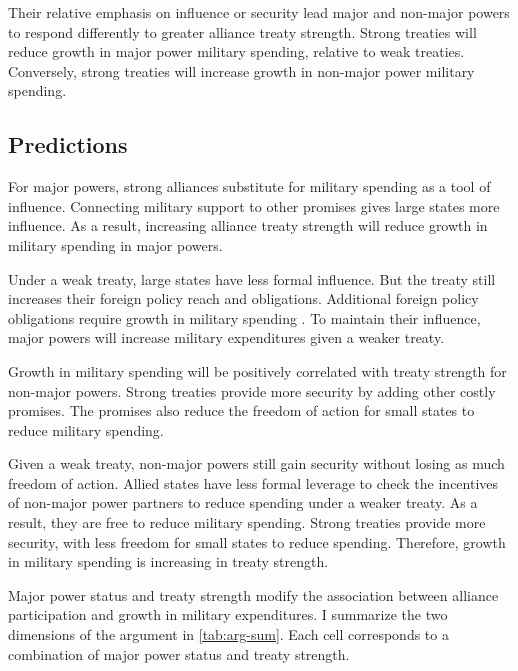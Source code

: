 \documentclass[12pt]{article}
\begin{document}
Their relative emphasis on influence or security lead major and non-major powers to respond differently to greater alliance treaty strength. 
Strong treaties will reduce growth in major power military spending, relative to weak treaties. 
Conversely, strong treaties will increase growth in non-major power military spending. 

 


\subsection{Predictions} 

 
For major powers, strong alliances substitute for military spending as a tool of influence. 
Connecting military support to other promises gives large states more influence.
As a result, increasing alliance treaty strength will reduce growth in military spending in major powers. 


Under a weak treaty, large states have less formal influence. 
But the treaty still increases their foreign policy reach and obligations. 
Additional foreign policy obligations require growth in military spending \citep{Diehl1994}. 
To maintain their influence, major powers will increase military expenditures given a weaker treaty. 


Growth in military spending will be positively correlated with treaty strength for non-major powers. 
Strong treaties provide more security by adding other costly promises. 
The promises also reduce the freedom of action for small states to reduce military spending. 


Given a weak treaty, non-major powers still gain security without losing as much freedom of action. 
Allied states have less formal leverage to check the incentives of non-major power partners to reduce spending under a weaker treaty. 
As a result, they are free to reduce military spending. 
Strong treaties provide more security, with less freedom for small states to reduce spending. 
Therefore, growth in military spending is increasing in treaty strength. 


Major power status and treaty strength modify the association between alliance participation and growth in military expenditures. 
I summarize the two dimensions of the argument in \autoref{tab:arg-sum}. 
Each cell corresponds to a combination of major power status and treaty strength. 
\end{document}
